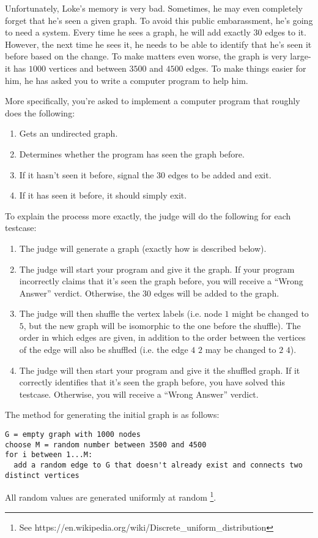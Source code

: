 \noindent
Unfortunately, Loke's memory is very bad. Sometimes, he may even completely forget that he's seen a given graph. 
To avoid this public embarassment, he's going to need a system. Every time he sees a graph, he will add exactly $30$
edges to it. However, the next time he sees it, he needs to be able to identify that he's seen it before based on the
change. To make matters even worse, the graph is very large- it has $1000$ vertices and between $3500$ and $4500$ edges.
To make things easier for him, he has asked you to write a computer program to help him.

More specifically, you're asked to implement a computer program that roughly does the following:
\begin{enumerate}
  \item Gets an undirected graph.
  \item Determines whether the program has seen the graph before.
  \item If it hasn't seen it before, signal the $30$ edges to be added and exit.
  \item If it has seen it before, it should simply exit.
\end{enumerate}
To explain the process more exactly, the judge will do the following for each testcase:
\begin{enumerate}
  \item The judge will generate a graph (exactly how is described below).
  \item The judge will start your program and give it the graph. If your program incorrectly claims that it's seen the graph before,
  you will receive a ``Wrong Answer'' verdict. Otherwise, the $30$ edges will be added to the graph.
  \item The judge will then shuffle the vertex labels (i.e. node $1$ might be changed to $5$, but the new
  graph will be isomorphic to the one before the shuffle). The order in which edges are given, in addition to the
  order between the vertices of the edge will also be shuffled (i.e. the edge $4$ $2$ may be changed to $2$ $4$).
  \item The judge will then start your program and give it the shuffled graph. If it correctly identifies that
  it's seen the graph before, you have solved this testcase. Otherwise, you will receive a ``Wrong Answer'' verdict.
\end{enumerate}


The method for generating the initial graph is as follows:
\begin{verbatim}
G = empty graph with 1000 nodes
choose M = random number between 3500 and 4500
for i between 1...M:
  add a random edge to G that doesn't already exist and connects two distinct vertices
\end{verbatim}
All random values are generated uniformly at random \footnote{See https://en.wikipedia.org/wiki/Discrete\_uniform\_distribution}.

